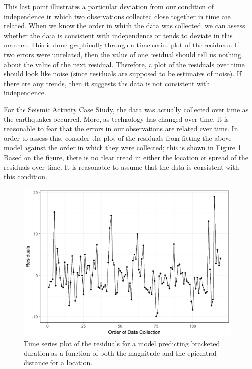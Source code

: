 \documentclass[]{book}
\theoremstyle{definition}
\theoremstyle{definition}
\theoremstyle{definition}
\theoremstyle{remark}
\begin{document}
This last point illustrates a particular deviation from our condition of
independence in which two observations collected close together in time
are related. When we know the order in which the data was collected, we
can assess whether the data is consistent with independence or tends to
deviate in this manner. This is done graphically through a time-series
plot of the residuals. If two errors were unrelated, then the value of
one residual should tell us nothing about the value of the next
residual. Therefore, a plot of the residuals over time should look like
noise (since residuals are supposed to be estimates of noise). If there
are any trends, then it suggests the data is not consistent with
independence.

For the \protect\hyperlink{CaseGreece}{Seismic Activity Case Study}, the
data was actually collected over time as the earthquakes occurred. More,
as technology has changed over time, it is reasonable to fear that the
errors in our observations are related over time. In order to assess
this, consider the plot of the residuals from fitting the above model
against the order in which they were collected; this is shown in Figure
\ref{fig:regassessment-independence}. Based on the figure, there is no
clear trend in either the location or spread of the residuals over time.
It is reasonable to assume that the data is consistent with this
condition.

\begin{figure}

{\centering \includegraphics[width=0.8\linewidth]{./Images/regassessment-independence-1} 

}

\caption{Time series plot of the residuals for a model predicting bracketed duration as a function of both the magnitude and the epicentral distance for a location.}\label{fig:regassessment-independence}
\end{figure}
\end{document}
